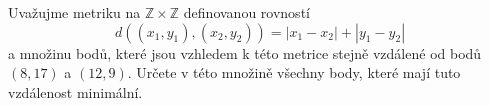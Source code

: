 Uvažujme metriku na $\mathbb{Z}\times \mathbb{Z}$ definovanou rovností
$$d((x_{1},y_{1}),(x_{2},y_{2})) =\left | x_{1}-x_{2} \right |+\left |
y_{1}-y_{2} \right |$$ a množinu bodů, které jsou vzhledem k této metrice stejně
vzdálené od bodů $(8,17)$ a $(12,9)$. Určete v této množině všechny body, které
mají tuto vzdálenost minimální.
